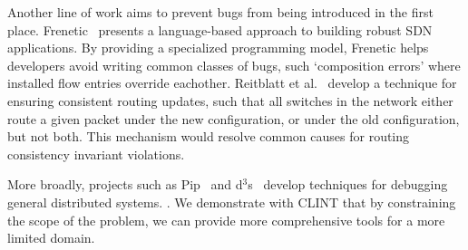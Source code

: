 Another line of work aims to prevent bugs from being introduced in the first
place. Frenetic~\cite{frenetic} presents a language-based approach to building
robust SDN applications. By providing a specialized programming model, Frenetic helps developers avoid writing common classes of
bugs, such `composition errors' where installed flow entries override eachother.
Reitblatt et al.~\cite{consistentupdates} develop a technique for ensuring
consistent routing updates, such that all switches in the network either route
a given packet under the new configuration, or under the old configuration,
but not both. This mechanism would resolve common causes for routing consistency 
invariant violations.

More broadly, projects such as Pip~\cite{pip} and d$^3$s~\cite{d3s} develop
techniques for debugging general distributed systems. . 
We demonstrate with CLINT that by constraining the scope of the problem,
we can provide more comprehensive tools for a more limited domain. 





